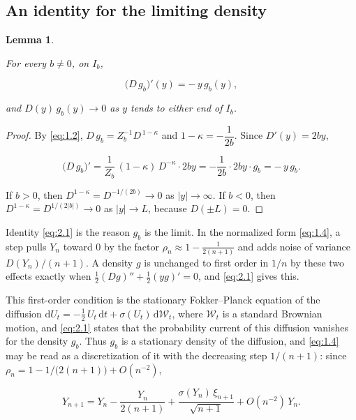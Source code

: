 \documentclass[aip,jmp,preprint,onecolumn,floatfix,superscriptaddress,nofootinbib,11pt]{revtex4-2}
\theoremstyle{plain}
\newtheorem{lemma}{Lemma}
\theoremstyle{remark}
\numberwithin{equation}{section}
\newcommand{\dd}{\mathrm{d}}
\begin{document}
\subsection{An identity for the limiting density}\label{sec:2}

\begin{lemma}\label{lem:1}

For every $b\ne0$, on $I_b$,

\begin{equation}
\big(D\,g_b\big)'(y)=-\,y\,g_b(y),
\label{eq:2.1}
\end{equation}

and $D(y)\,g_b(y)\to0$ as $y$ tends to either end of $I_b$.

\end{lemma}

\begin{proof} By \eqref{eq:1.2}, $D\,g_b=Z_b^{-1}D^{\,1-\kappa}$ and $1-\kappa=-\dfrac{1}{2b}$. Since $D'(y)=2by$,

\begin{equation*}
\big(D\,g_b\big)'=\frac{1}{Z_b}\,(1-\kappa)\,D^{-\kappa}\cdot 2by=-\frac{1}{2b}\cdot 2by\cdot g_b=-\,y\,g_b .
\end{equation*}

If $b>0$, then $D^{1-\kappa}=D^{-1/(2b)}\to0$ as $|y|\to\infty$. If $b<0$, then $D^{1-\kappa}=D^{1/(2|b|)}\to0$ as $|y|\to L$, because $D(\pm L)=0$. 
\end{proof}

Identity \eqref{eq:2.1} is the reason $g_b$ is the limit. In the normalized form \eqref{eq:1.4}, a step pulls $Y_n$ toward $0$ by the factor $\rho_n\approx1-\tfrac{1}{2(n+1)}$ and adds noise of variance $D(Y_n)/(n+1)$. A density $g$ is unchanged to first order in $1/n$ by these two effects exactly when $\tfrac12(Dg)''+\tfrac12(yg)'=0$, and \eqref{eq:2.1} gives this.

This first-order condition is the stationary Fokker--Planck equation of the diffusion $\dd U_t=-\tfrac12\,U_t\,\dd t+\sigma(U_t)\,\dd\mathcal W_t$, where $\mathcal W_t$ is a standard Brownian motion, and \eqref{eq:2.1} states that the probability current of this diffusion vanishes for the density $g_b$. Thus $g_b$ is a stationary density of the diffusion, and \eqref{eq:1.4} may be read as a discretization of it with the decreasing step $1/(n+1)$: since $\rho_n=1-1/\big(2(n+1)\big)+O(n^{-2})$,

\begin{equation*}
Y_{n+1}=Y_n-\frac{Y_n}{2(n+1)}+\frac{\sigma(Y_n)\,\xi_{n+1}}{\sqrt{n+1}}+O(n^{-2})\,Y_n .
\end{equation*}
\end{document}
